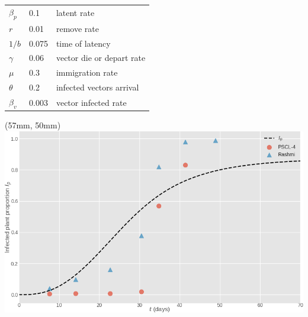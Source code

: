 \begin{frame}{}
\begin{textblock*}{60mm}
\begin{tabular}{@{}lll@{}}
            \midrule
                $\beta_p$ 
                & 0.1 
                & latent rate  
            \\ 
                $r$ 
                & 0.01 
                & remove rate 
            \\
                $1/b$ 
                & 0.075 
                & time of latency
            \\
                $\gamma$ 
                & 0.06 
                & vector die or depart rate 
            \\
                $\mu$ 
                & 0.3 
                & immigration rate 
            \\
                $\theta$ 
                & 0.2 
                & infected vectors 
                    arrival 
                \\
                $\beta_v$ 
                & 0.003 
                & vector infected 
                rate
            \\
            \bottomrule
        \end{tabular}
    \end{textblock*}
    \begin{textblock*}{70mm}(57mm, 50mm)
        \includegraphics[width=\linewidth]{assets/data_dynamics_jegger}
    \end{textblock*}
\end{frame}